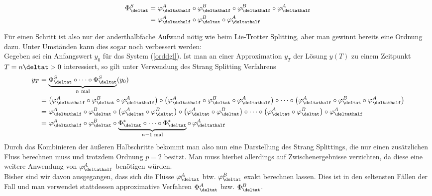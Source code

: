 \noindent\begin{minipage}{0.3\textwidth}

\end{minipage}%
\hfill%
\begin{minipage}{0.7\textwidth}
\begin{align}
\Phi_{\deltat}^S&=\varphi_{\deltathalf}^A\circ\varphi_{\deltathalf}^B\circ\varphi_{\deltathalf}^B\circ\varphi_{\deltathalf}^A\nonumber\\
&=\varphi_{\deltathalf}^A\circ\varphi_{\deltat}^B\circ\varphi_{\deltathalf}^A
\end{align}
\end{minipage}
Für einen Schritt ist also nur der anderthalbfache Aufwand nötig wie beim Lie-Trotter Splitting, aber man gewinnt bereits eine Ordnung dazu. Unter Umständen kann dies sogar noch verbessert werden:\\
Gegeben sei ein Anfangswert $y_0$ für das System (\ref{orddgl}). Ist man an einer Approximation $y_T$ der Lösung $y(T)$ zu einem Zeitpunkt $T=n\deltat>0$ interessiert, so gilt unter Verwendung des Strang Splitting Verfahrens
\begin{align*}
y_T&=\underbrace{\Phi_{\deltat}^S\circ\dots\circ\Phi_{\deltat}^S}_{n\text{ mal}}(y_0)\\
&=\left(\varphi_{\deltathalf}^A\circ\varphi_{\deltat}^B\circ\varphi_{\deltathalf}^A\right)\circ\left(
\varphi_{\deltathalf}^A\circ\varphi_{\deltat}^B\circ\varphi_{\deltathalf}^A\right)\circ\dots\circ\left(
\varphi_{\deltathalf}^A\circ\varphi_{\deltat}^B\circ\varphi_{\deltathalf}^A\right)\\
&=\varphi_{\deltathalf}^A\circ\varphi_{\deltat}^B\circ\left(\varphi_{\deltat}^A\circ\varphi_{\deltat}^B\right)\circ\left(\varphi_{\deltat}^A\circ\varphi_{\deltat}^B\right)\circ\dots\circ\left(\varphi_{\deltat}^A\circ\varphi_{\deltat}^B\right)\circ\varphi_{\deltathalf}^A\\
&=\varphi_{\deltathalf}^A\circ\varphi_{\deltat}^B\circ
\underbrace{\Phi_{\deltat}^*\circ\dots\circ\Phi_{\deltat}^*}_{n-1\text{ mal}}\circ\,\varphi_{\deltathalf}^A
\end{align*}
Durch das Kombinieren der äußeren Halbschritte bekommt man also nun eine Darstellung des Strang Splittings, die nur einen zusätzlichen Fluss berechnen muss und trotzdem Ordnung $p=2$ besitzt. Man muss hierbei allerdings auf Zwischenergebnisse verzichten, da diese eine weitere Anwendung von $\varphi_{\deltathalf}^A$ benötigen würden.\\[0.5cm]
Bisher sind wir davon ausgegangen, dass sich die Flüsse $\varphi_{\deltat}^A$ btw. $\varphi_{\deltat}^B$ exakt berechnen lassen. Dies ist in den seltensten Fällen der Fall und man verwendet stattdessen approximative Verfahren $\Phi_{\deltat}^A$ bzw. $\Phi_{\deltat}^B$. 
